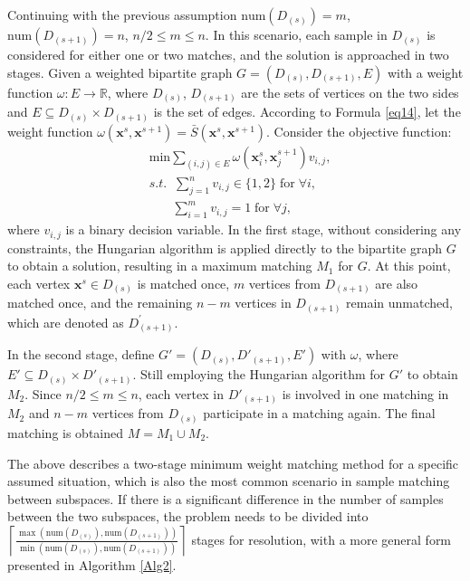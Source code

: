 \documentclass[lettersize,journal]{IEEEtran}
\begin{document}
Continuing with the previous assumption $\text{num}(D_{(s)})=m$, $\text{num}(D_{(s+1)})=n$, $n/2\le m\le n$. In this scenario, each 
sample in $D_{(s)}$ is considered for either one or two
 matches, and the solution is approached in two stages. Given a 
 weighted bipartite graph $G=(D_{(s)},D_{(s+1)},E)$ with a weight 
 function $\omega:E\rightarrow\mathbb{R}$, where $D_{(s)}$, $D_{(s+1)}$ 
 are the sets of vertices on the two sides and $E\subseteq D_{(s)}
 \times D_{(s+1)}$ is the set of edges. According to Formula 
 \eqref{eq14}, let the weight function $\omega(\boldsymbol{x}^{s},
 \boldsymbol{x}^{s+1})=\bar{S}(\boldsymbol{x}^{s},\boldsymbol{x}
 ^{s+1})$. Consider the objective function:
\begin{equation*}
\begin{aligned}
&\text{min}\textstyle\sum\limits_{(i,j)\in{E}}\omega(\boldsymbol{x}^{s}_i,\boldsymbol{x}_j^{s+1})v_{i,j},\\
&s.t. \;\;
\textstyle\sum\limits_{j=1}^nv_{i,j} \in\{1,2\}\;\text{for}\;\forall i, \\
&\quad\;\;\;\textstyle\sum\limits_{i=1}^mv_{i,j} =1\;\text{for}\;\forall j,
\end{aligned}
\end{equation*}
where $v_{i,j}$ is a binary decision variable. In the first stage, 
without considering any constraints, the Hungarian algorithm is 
applied directly to the bipartite graph $G$ to obtain a solution, 
resulting in a maximum matching $M_1$ for $G$. At this point, 
each vertex $\boldsymbol{x}^s\in D_{(s)}$ is matched once, $m$ 
vertices from $D_{(s+1)}$ are also matched once, and the 
remaining $n-m$ vertices in $D_{(s+1)}$ remain unmatched, which 
are denoted as $D^\prime_{(s+1)}$.

In the second stage, define $G'=(D_{(s)},D'_{(s+1)},E')$ with 
$\omega$, where $E'\subseteq D_{(s)}\times D'_{(s+1)}$. Still 
employing the Hungarian algorithm for $G'$ to obtain $M_2$. Since 
$n/2\le m\le n$, each vertex in $D'_{(s+1)}$ is involved in one 
matching in $M_2$ and $n-m$ vertices from $D_{(s)}$ participate 
in a matching again. The final matching is obtained $M=M_1\cup
{M_2}$.

The above describes a two-stage minimum weight matching method 
for a specific assumed situation, which is also the most common 
scenario in sample matching between subspaces. If there is a 
significant difference in the number of samples between the two 
subspaces, the problem needs to be divided into 
$\left\lceil \frac{\max(\text{num}{(D_{(s)}),\text{num}
(D_{(s+1)})})}{\min(\text{num}{(D_{(s)}),\text{num}(D_{(s+1)})})}
\right\rceil$ stages for resolution, with a more general form 
presented in Algorithm \ref{Alg2}.
\end{document}
